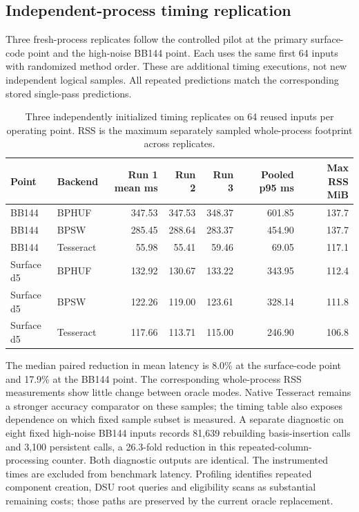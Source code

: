 \subsection{Independent-process timing replication}
Three fresh-process replicates follow the controlled pilot at the primary surface-code point and the high-noise BB144 point. Each uses the same first 64 inputs with randomized method order. These are additional timing executions, not new independent logical samples. All repeated predictions match the corresponding stored single-pass predictions.
\begin{table}[t]\centering\scriptsize
\caption{Three independently initialized timing replicates on 64 reused inputs per operating point. RSS is the maximum separately sampled whole-process footprint across replicates.}\label{tab:replication}
\begin{tabular}{llrrrrr}\toprule Point&Backend&Run 1 mean ms&Run 2&Run 3&Pooled p95 ms&Max RSS MiB\\\midrule
BB144&BPHUF&347.53&347.53&348.37&601.85&137.7\\
BB144&BPSW&285.45&288.64&283.37&454.90&137.7\\
BB144&Tesseract&55.98&55.41&59.46&69.05&117.1\\
Surface d5&BPHUF&132.92&130.67&133.22&343.95&112.4\\
Surface d5&BPSW&122.26&119.00&123.61&328.14&111.8\\
Surface d5&Tesseract&117.66&113.71&115.00&246.90&106.8\\
\bottomrule\end{tabular}\end{table}
The median paired reduction in mean latency is 8.0\% at the surface-code point and 17.9\% at the BB144 point. The corresponding whole-process RSS measurements show little change between oracle modes. Native Tesseract remains a stronger accuracy comparator on these samples; the timing table also exposes dependence on which fixed sample subset is measured.
A separate diagnostic on eight fixed high-noise BB144 inputs records 81,639 rebuilding basis-insertion calls and 3,100 persistent calls, a 26.3-fold reduction in this repeated-column-processing counter. Both diagnostic outputs are identical. The instrumented times are excluded from benchmark latency. Profiling identifies repeated component creation, DSU root queries and eligibility scans as substantial remaining costs; those paths are preserved by the current oracle replacement.
